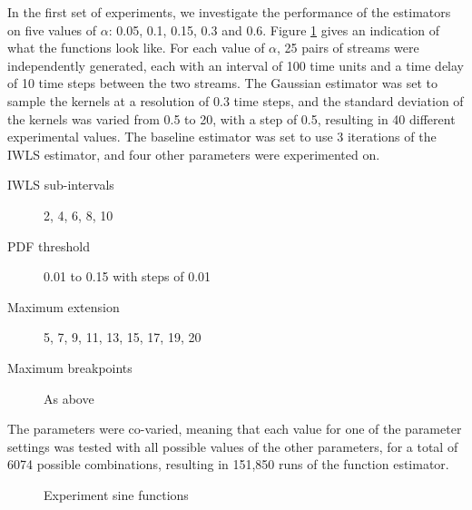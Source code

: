 \documentclass[a4paper,11pt]{article}
\begin{document}
In the first set of experiments, we investigate the performance of the
estimators on five values of $\alpha$: 0.05, 0.1, 0.15, 0.3 and 0.6. Figure
\ref{fig:prelimexp} gives an indication of what the functions look like. For
each value of $\alpha$, 25 pairs of streams were independently generated, each
with an interval of 100 time units and a time delay of 10 time steps between the
two streams. The Gaussian estimator was set to sample the kernels at a
resolution of 0.3 time steps, and the standard deviation of the kernels was
varied from 0.5 to 20, with a step of 0.5, resulting in 40 different
experimental values. The baseline estimator was set to use 3 iterations of the
IWLS estimator, and four other parameters were experimented on.
\begin{description}
\item[IWLS sub-intervals] 2, 4, 6, 8, 10
\item[PDF threshold] 0.01 to 0.15 with steps of 0.01
\item[Maximum extension] 5, 7, 9, 11, 13, 15, 17, 19, 20
\item[Maximum breakpoints] As above
\end{description} The parameters were co-varied, meaning that each value for one
of the parameter settings was tested with all possible values of the other
parameters, for a total of 6074 possible combinations, resulting in 151,850 runs
of the function estimator.


\begin{figure}
\label{fig:prelimexp}
\caption{Experiment sine functions}
\end{figure}
\end{document}

